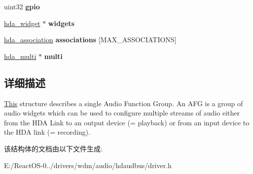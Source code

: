 \begin{DoxyCompactItemize}
uint32 {\bfseries gpio}
\item 
\mbox{\label{structhda__audio__group_aa0af36541e561f4dc53ee065c8e0809d}} 
\hyperlink{structhda__widget}{hda\+\_\+widget} $\ast$ {\bfseries widgets}
\item 
\mbox{\label{structhda__audio__group_a94eac0fd1ef6f2712c99b59df1b1e5f8}} 
\hyperlink{structhda__association}{hda\+\_\+association} {\bfseries associations} \mbox{[}M\+A\+X\+\_\+\+A\+S\+S\+O\+C\+I\+A\+T\+I\+O\+NS\mbox{]}
\item 
\mbox{\label{structhda__audio__group_accadd2578da1877de4447708e9512514}} 
\hyperlink{structhda__multi}{hda\+\_\+multi} $\ast$ {\bfseries multi}
\end{DoxyCompactItemize}


\subsection{详细描述}
\hyperlink{namespace_this}{This} structure describes a single Audio Function Group. An A\+FG is a group of audio widgets which can be used to configure multiple streams of audio either from the H\+DA Link to an output device (= playback) or from an input device to the H\+DA link (= recording). 

该结构体的文档由以下文件生成\+:\begin{DoxyCompactItemize}
\item 
E\+:/\+React\+O\+S-\/0../drivers/wdm/audio/hdaudbus/driver.\+h\end{DoxyCompactItemize}
